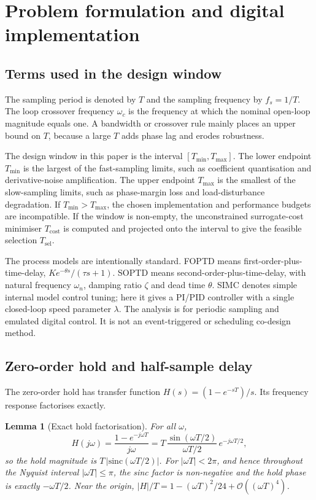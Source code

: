 \documentclass[a4paper,fleqn]{cas-sc}
\newtheorem{lemma}{Lemma}
\theoremstyle{remark}
\newcommand{\Tmin}{T_{\min}}
\newcommand{\Tmax}{T_{\max}}
\newcommand{\wc}{\omega_c}
\newcommand{\wn}{\omega_n}
\newcommand{\Tcost}{T_{\mathrm{cost}}}
\newcommand{\Tsel}{T_{\mathrm{sel}}}
\begin{document}
\section{Problem formulation and digital implementation}
\label{sec:prelim}

\subsection{Terms used in the design window}
\label{sec:terms}
The sampling period is denoted by $T$ and the sampling frequency by
$f_s=1/T$. The loop crossover frequency $\wc$ is the frequency at which the
nominal open-loop magnitude equals one. A bandwidth or crossover rule mainly
places an upper bound on $T$, because a large $T$ adds phase lag and erodes
robustness.

The design window in this paper is the interval
$[\Tmin,\Tmax]$. The lower endpoint $\Tmin$ is the largest of the fast-sampling
limits, such as coefficient quantisation and derivative-noise amplification.
The upper endpoint $\Tmax$ is the smallest of the slow-sampling limits, such
as phase-margin loss and load-disturbance degradation. If $\Tmin>\Tmax$, the
chosen implementation and performance budgets are incompatible. If the window
is non-empty, the unconstrained surrogate-cost minimiser $\Tcost$ is computed
and projected onto the interval to give the feasible selection $\Tsel$.

The process models are intentionally standard. FOPTD means
first-order-plus-time-delay, $K e^{-\theta s}/(\tau s+1)$. SOPTD means
second-order-plus-time-delay, with natural frequency $\wn$, damping ratio
$\zeta$ and dead time $\theta$. SIMC denotes simple internal model control
tuning; here it gives a PI/PID controller with a single closed-loop speed
parameter $\lambda$. The analysis is for periodic sampling and emulated
digital control. It is not an event-triggered or scheduling co-design method.

\subsection{Zero-order hold and half-sample delay}
\label{sec:zoh}
The zero-order hold has transfer function $H(s)=(1-e^{-sT})/s$. Its frequency
response factorises exactly.
\begin{lemma}[Exact hold factorisation]
\label{lem:zoh}
For all $\omega$,
\begin{equation}
H(j\omega)=\frac{1-e^{-j\omega T}}{j\omega}
= T\,\frac{\sin(\omega T/2)}{\omega T/2}\,e^{-j\omega T/2},
\label{eq:zoh}
\end{equation}
so the hold magnitude is $T\,|\mathrm{sinc}(\omega T/2)|$. For
$|\omega T|<2\pi$, and hence throughout the Nyquist interval
$|\omega T|\le\pi$, the sinc factor is non-negative and the hold phase is
exactly $-\omega T/2$. Near the origin,
$|H|/T = 1-(\omega T)^2/24+\mathcal{O}((\omega T)^4)$.
\end{lemma}
\end{document}
